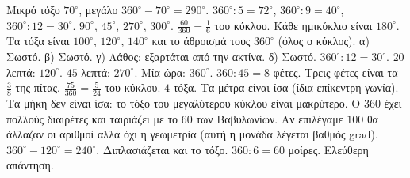  Μικρό τόξο $70^\circ$, μεγάλο $360^\circ-70^\circ=290^\circ$.
 $360^\circ:5=72^\circ$, $360^\circ:9=40^\circ$, $360^\circ:12=30^\circ$.
 $90^\circ$, $45^\circ$, $270^\circ$, $300^\circ$.
 $\frac{60}{360}=\frac{1}{6}$ του κύκλου.
 Κάθε ημικύκλιο είναι $180^\circ$.
 Τα τόξα είναι $100^\circ$, $120^\circ$, $140^\circ$ και το άθροισμά τους $360^\circ$ (όλος ο κύκλος).
 α) Σωστό. β) Σωστό. γ) Λάθος: εξαρτάται από την ακτίνα. δ) Σωστό.
 $360^\circ:12=30^\circ$.
 $20$ λεπτά: $120^\circ$. $45$ λεπτά: $270^\circ$. Μία ώρα: $360^\circ$.
 $360:45=8$ φέτες. Τρεις φέτες είναι τα $\frac{3}{8}$ της πίτας.
 $\frac{75}{360}=\frac{5}{24}$ του κύκλου.
 $4$ τόξα.
 Τα μέτρα είναι ίσα (ίδια επίκεντρη γωνία). Τα μήκη δεν είναι ίσα: το τόξο του μεγαλύτερου κύκλου είναι μακρύτερο.
 Ο $360$ έχει πολλούς διαιρέτες και ταιριάζει με το $60$ των Βαβυλωνίων. Αν επιλέγαμε $100$ θα άλλαζαν οι αριθμοί αλλά όχι η γεωμετρία (αυτή η μονάδα λέγεται βαθμός grad).
 $360^\circ-120^\circ=240^\circ$.
 Διπλασιάζεται και το τόξο.
 $360:6=60$ μοίρες.
 Ελεύθερη απάντηση.
